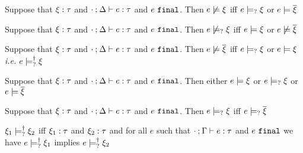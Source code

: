 \begin{lem}
  \label{lem:neg-satisfy}
  Suppose that $\xi : \tau$ and $\cdot \mathbin{;} \Delta \vdash e : \tau$ and $e ~\mathtt{final}$. Then $e \not\models \xi$ iff $e \models_{?} \xi$ or $e \models \overline{\xi}$
\end{lem}
\begin{lem}
  \label{lem:neg-possible-satisfy}
  Suppose that $\xi : \tau$ and $\cdot \mathbin{;} \Delta \vdash e : \tau$ and $e ~\mathtt{final}$. Then $e \not\models_{?} \xi$ iff $e \models \xi$ or $e \not\models \overline{\xi}$
\end{lem}
\begin{lem}
  \label{lem:neg-dual-satisfy}
  Suppose that $\xi : \tau$ and $\cdot \mathbin{;} \Delta \vdash e : \tau$ and $e ~\mathtt{final}$. Then $e \not\models \overline{\xi}$ iff $e \models_{?} \xi$ or $e \models \xi$ \textit{i.e.} $e \models_{?}^{\dag} \xi$
\end{lem}
\begin{lem}
  \label{lem:coverage-constraint-satisfy}
  Suppose that $\xi : \tau$ and $\cdot \mathbin{;} \Delta \vdash e : \tau$ and $e ~\mathtt{final}$. Then either $e \models \xi$ or $e \models_{?} \xi$ or $e \models \overline{\xi}$
\end{lem}

\begin{corol}
  \label{corol:possible-satisfy-dual}
  Suppose that $\xi : \tau$ and $\cdot \mathbin{;} \Delta \vdash e : \tau$ and $e ~\mathtt{final}$. Then $e \models_{?} \xi$ iff $e \models_{?} \overline{\xi}$
\end{corol}

\begin{defn}
  \label{defn:nn-entailment}
  $\xi_1 \models_{?}^{\dag} \xi_2$ iff $\xi_1 : \tau$ and $\xi_2 : \tau$ and for all $e$ such that $\cdot \mathbin{;} \Gamma \vdash e : \tau$ and $e ~\mathtt{final}$ we have $e \models_{?}^{\dag} \xi_1$ implies $e \models_{?}^{\dag} \xi_2$ 
\end{defn}

